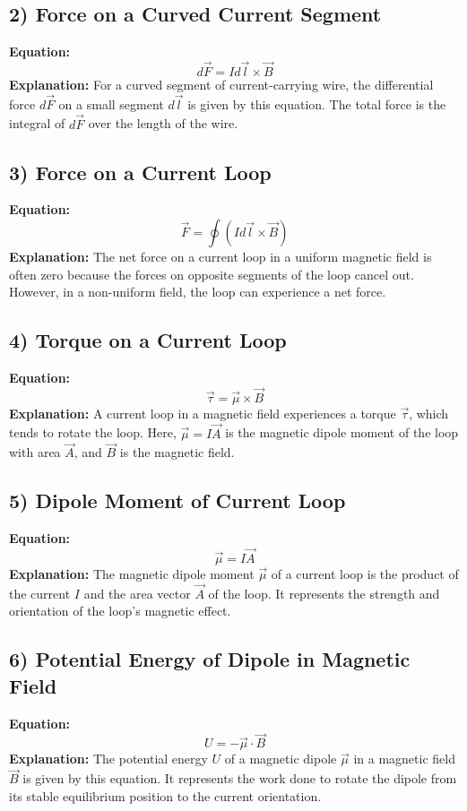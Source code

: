 \documentclass{article}
\begin{document}
\subsection*{2) Force on a Curved Current Segment}
\textbf{Equation:} 
\[ d\vec{F} = I d\vec{l} \times \vec{B} \]
\textbf{Explanation:} 
For a curved segment of current-carrying wire, the differential force \( d\vec{F} \) on a small segment \( d\vec{l} \) is given by this equation. The total force is the integral of \( d\vec{F} \) over the length of the wire.

\subsection*{3) Force on a Current Loop}
\textbf{Equation:} 
\[ \vec{F} = \oint (I d\vec{l} \times \vec{B}) \]
\textbf{Explanation:} 
The net force on a current loop in a uniform magnetic field is often zero because the forces on opposite segments of the loop cancel out. However, in a non-uniform field, the loop can experience a net force.

\subsection*{4) Torque on a Current Loop}
\textbf{Equation:} 
\[ \vec{\tau} = \vec{\mu} \times \vec{B} \]
\textbf{Explanation:} 
A current loop in a magnetic field experiences a torque \( \vec{\tau} \), which tends to rotate the loop. Here, \( \vec{\mu} = I\vec{A} \) is the magnetic dipole moment of the loop with area \( \vec{A} \), and \( \vec{B} \) is the magnetic field.

\subsection*{5) Dipole Moment of Current Loop}
\textbf{Equation:} 
\[ \vec{\mu} = I\vec{A} \]
\textbf{Explanation:} 
The magnetic dipole moment \( \vec{\mu} \) of a current loop is the product of the current \( I \) and the area vector \( \vec{A} \) of the loop. It represents the strength and orientation of the loop's magnetic effect.

\subsection*{6) Potential Energy of Dipole in Magnetic Field}
\textbf{Equation:} 
\[ U = -\vec{\mu} \cdot \vec{B} \]
\textbf{Explanation:} 
The potential energy \( U \) of a magnetic dipole \( \vec{\mu} \) in a magnetic field \( \vec{B} \) is given by this equation. It represents the work done to rotate the dipole from its stable equilibrium position to the current orientation.
\end{document}
